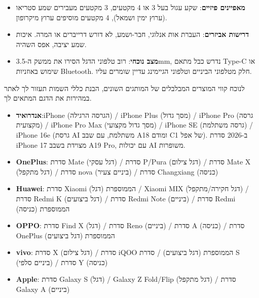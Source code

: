 
\begin{itemize}
  \item \textbf{מאפיינים פיזיים}: שקע עגול בעל 3 או 4 מקטעים, 3 מקטעים מעבירים שמע סטריאו (ערוץ ימין ושמאל), 4 מקטעים מוסיפים ערוץ מיקרופון.
  \item \textbf{דרישות אביזרים}: העברת אות אנלוגי, חבר-ושמע, לא דורש דרייברים או המרה. איכות שמע יציבה, אפס השהיה.
  \item \textbf{מצב נוכחי}: רוב טלפוני הדגל הסירו את ממשק ה-3.5mm, נדרש כבל מתאם Type-C או שימוש באוזניות Bluetooth. חלק מטלפוני הביניים וטלפוני הגיימינג עדיין שומרים עליו.
\end{itemize}


לנוכח קווי המוצרים המבלבלים של המותגים השונים, הבנת כללי השמות תעזור לך לאתר במהירות את הדגם המתאים לך.


\begin{itemize}
  \item \textbf{אנדרואיד}:iPhone (הגרסה הרגילה) / iPhone Plus (מסך גדול) / iPhone Pro (גרסה מקצועית) / iPhone Pro Max (מסך גדול מקצועי) / iPhone SE (גרסה משתלמת) / iPhone 16e (גרסת AI משתלמת, עם שבב A18 ומודם C1 של אפל). ב-2026 סדרת iPhone 17 מצוידת בשבב A19 Pro, עם יכולות AI משופרות.
  \item \textbf{OnePlus}: סדרת Mate (דגל עסקי) / סדרת P/Pura (דגל צילום) / סדרת Mate X (דגל מתקפל) / סדרת nova (ביניים צעיר) / סדרת Changxiang (כניסה)
  \item \textbf{Huawei}: סדרת Xiaomi הממוספרת (דגל) / Xiaomi MIX (דגל חקירה/מתקפל) / סדרת Redmi K (דגל ביצועים) / סדרת Redmi Note (ביניים) / סדרת Redmi הממוספרת (כניסה)
  \item \textbf{OPPO}: סדרת Find X (דגל) / סדרת Reno (ביניים) / סדרת A (כניסה) / סדרת OnePlus הממוספרת (דגל ביצועים)
  \item \textbf{vivo}: סדרת X (דגל צילום) / סדרת iQOO הממוספרת (דגל ביצועים) / סדרת S (ביניים סלפי) / סדרת Y (כניסה)
  \item \textbf{Apple}: סדרת Galaxy S (דגל) / Galaxy Z Fold/Flip (דגל מתקפל) / סדרת Galaxy A (ביניים)
\end{itemize}


